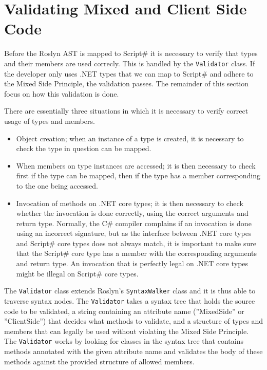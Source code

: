 \section{Validating Mixed and Client Side Code} %
\label{sec:syntax_tree_validation}
	Before the Roslyn AST is mapped to Script\# it is necessary to verify that types and their members are used correcly. This is handled by the \texttt{Validator} class. If the developer only uses .NET types that we can map to Script\# and adhere to the Mixed Side Principle, the validation passes. The remainder of this section focus on how this validation is done.
	


There are essentially three situations in which it is necessary to verify correct usage of types and members.

\begin{itemize}
	\item Object creation; when an instance of a type is created, it is necessary to check the type in question can be mapped.
	\item When members on type instances are accessed; it is then necessary to check first if the type can be mapped, then if the type has a member corresponding to the one being accessed.
	\item Invocation of methods on .NET core types; it is then necessary to check whether the invocation is done correctly, using the correct arguments and return type. Normally, the C\# compiler complains if an invocation is done using an incorrect signature, but as the interface between .NET core types and Script\# core types does not always match, it is important to make sure that the Script\# core type has a member with the corresponding arguments and return type. An invocation that is perfectly legal on .NET core types might be illegal on Script\# core types.
\end{itemize}

The \texttt{Validator} class extends Roslyn's \texttt{SyntaxWalker} class and it is thus able to traverse syntax nodes. The \texttt{Validator} takes a syntax tree that holds the source code to be validated, a string containing an attribute name (''MixedSide'' or ''ClientSide'') that decides what methods to validate, and a structure of types and members that can legally be used without violating the Mixed Side Principle. The \texttt{Validator} works by looking for classes in the syntax tree that contains methods annotated with the given attribute name and validates the body of these methods against the provided structure of allowed members.

